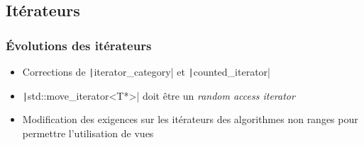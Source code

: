 \documentclass[C++.tex]{subfiles}
\begin{document}
\subsection*{Itérateurs}
\begin{frame}[fragile]
	\frametitle{Évolutions des itérateurs}
	\begin{itemize}
		\item Corrections de \texttt|iterator_category| et \texttt|counted_iterator|
		\item \texttt|std::move_iterator<T*>| doit être un \textit{random access iterator}
		\item Modification des exigences sur les itérateurs des algorithmes \og{}non ranges\fg{} pour permettre l'utilisation de vues
	\end{itemize}

\end{frame}
\end{document}
